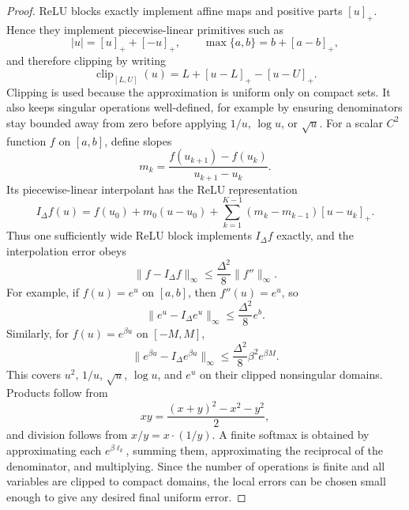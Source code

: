 \documentclass[11pt]{article}
\begin{document}
\begin{proof}
ReLU blocks exactly implement affine maps and positive parts \([u]_+\). Hence
they implement piecewise-linear primitives such as
\[
|u|=[u]_+ +[-u]_+,
\qquad
\max\{a,b\}=b+[a-b]_+,
\]
and therefore clipping by writing
\[
\operatorname{clip}_{[L,U]}(u)
=
L+[u-L]_+-[u-U]_+ .
\]
Clipping is used because the approximation is uniform only on compact sets.
It also keeps singular operations well-defined, for example by ensuring
denominators stay bounded away from zero before applying \(1/u\), \(\log u\),
or \(\sqrt u\).
For a scalar \(C^2\) function \(f\) on \([a,b]\), define slopes
\[
m_k=\frac{f(u_{k+1})-f(u_k)}{u_{k+1}-u_k}.
\]
Its piecewise-linear interpolant has the ReLU representation
\[
I_\Delta f(u)
=
f(u_0)+m_0(u-u_0)
+\sum_{k=1}^{K-1}(m_k-m_{k-1})[u-u_k]_+ .
\]
Thus one sufficiently wide ReLU block implements \(I_\Delta f\) exactly, and
the interpolation error obeys
\[
\|f-I_\Delta f\|_\infty
\le
\frac{\Delta^2}{8}\|f''\|_\infty .
\]
For example, if \(f(u)=e^u\) on \([a,b]\), then \(f''(u)=e^u\), so
\[
\|e^u-I_\Delta e^u\|_\infty
\le
\frac{\Delta^2}{8}e^b .
\]
Similarly, for \(f(u)=e^{\beta u}\) on \([-M,M]\),
\[
\|e^{\beta u}-I_\Delta e^{\beta u}\|_\infty
\le
\frac{\Delta^2}{8}\beta^2 e^{\beta M}.
\]
This covers \(u^2\), \(1/u\), \(\sqrt u\), \(\log u\), and \(e^u\) on their
clipped nonsingular domains. Products follow from
\[
xy=\frac{(x+y)^2-x^2-y^2}{2},
\]
and division follows from \(x/y=x\cdot(1/y)\). A finite softmax is obtained by
approximating each \(e^{\beta \ell_k}\), summing them, approximating the
reciprocal of the denominator, and multiplying. Since the number of operations
is finite and all variables are clipped to compact domains, the local errors
can be chosen small enough to give any desired final uniform error.
\end{proof}
\end{document}
